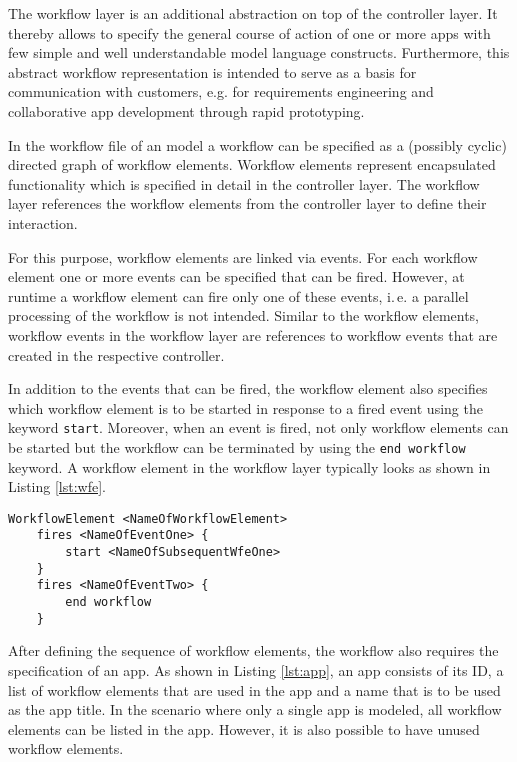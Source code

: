 
The workflow layer is an additional abstraction on top of the controller layer. It thereby allows to specify the general course of action of one or more apps with few simple and well understandable model language constructs. Furthermore, this abstract workflow representation is intended to serve as a basis for communication with customers, e.g. for requirements engineering and collaborative app development through rapid prototyping.

In the workflow file of an \MD model a workflow can be specified as a (possibly cyclic) directed graph of workflow elements. Workflow elements represent encapsulated functionality which is specified in detail in the controller layer. The workflow layer references the workflow elements from the controller layer to define their interaction.

For this purpose, workflow elements are linked via events. For each workflow element one or more events can be specified that can be fired. However, at runtime a workflow element can fire only one of these events, i.\,e. a parallel processing of the workflow is not intended. Similar to the workflow elements, workflow events in the workflow layer are references to workflow events that are created in the respective controller.

In addition to the events that can be fired, the workflow element also specifies which workflow element is to be started in response to a fired event using the keyword {\lstinline!start!}. Moreover, when an event is fired, not only workflow elements can be started but the workflow can be terminated by using the \lstinline!end workflow! keyword.
A workflow element in the workflow layer typically looks as shown in Listing \ref{lst:wfe}.

\begin{lstlisting}[language=MD2, label=lst:wfe, caption=Workflow Elements in the Workflow Layer]
 WorkflowElement <NameOfWorkflowElement>
 	fires <NameOfEventOne> {
		start <NameOfSubsequentWfeOne>
	}
	fires <NameOfEventTwo> {
		end workflow
	}
\end{lstlisting}

After defining the sequence of workflow elements, the workflow also requires the specification of an app. As shown in Listing \ref{lst:app}, an app consists of its ID, a list of workflow elements that are used in the app and a name that is to be used as the app title. In the scenario where only a single app is modeled, all workflow elements can be listed in the app. However, it is also possible to have unused workflow elements.

